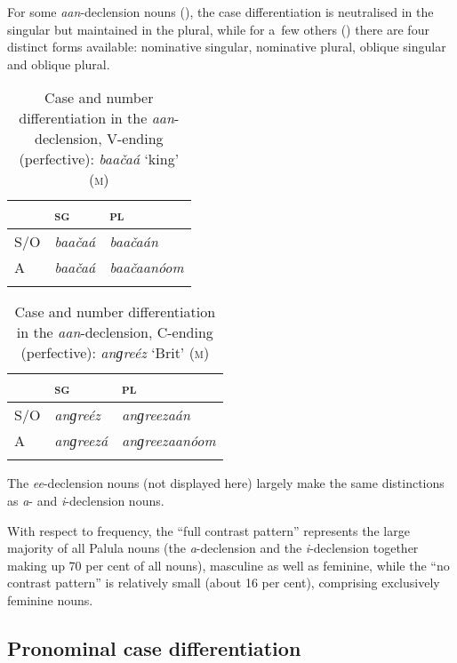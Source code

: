 For some \textit{aan}-declension nouns (), the case differentiation is neutralised in the singular but maintained in the plural, while for a~few others () there are four distinct forms available: nominative singular, nominative plural, oblique singular and oblique plural. 


\begin{table}[ht]
\caption{Case and number differentiation in the \textit{aan}-declension, V-ending (perfective): \textit{baačaá} `king' \textsc{(m)}}
\begin{tabularx}{\textwidth}{ Q Q Q }
\lsptoprule
&
\textsc{sg} &
\textsc{pl}\\\hline
S/O &
\textit{baačaá} &
\textit{baačaán} \\
A &
\textit{baačaá} &
\textit{baačaanóom} \\\lspbottomrule
\end{tabularx}
\label{tab:11-aanvdecl}
\end{table}

\begin{table}[ht]
\caption{Case and number differentiation in the \textit{aan}-declension, C-ending (perfective): \textit{anɡreéz} `Brit' \textsc{(m)}}
\begin{tabularx}{\textwidth}{ Q Q Q }
\lsptoprule
&
\textsc{sg} &
\textsc{pl}\\\hline
S/O &
\textit{anɡreéz} &
\textit{anɡreezaán} \\
A &
\textit{anɡreezá} &
\textit{anɡreezaanóom} \\\lspbottomrule
\end{tabularx}
\label{tab:11-aancdecl}
\end{table}


The \textit{ee}-declension nouns (not displayed here) largely make the same distinctions as \textit{a}- and \textit{i}-declension nouns.


With respect to frequency, the ``full contrast pattern'' represents the large majority of all Palula nouns (the \textit{a}-declension and the \textit{i}-declension together making up 70 per cent of all nouns), masculine as well as feminine, while the ``no contrast pattern'' is relatively small (about 16 per cent), comprising exclusively feminine nouns.


\subsection{Pronominal case differentiation}
\label{subsec:11-2-2}


